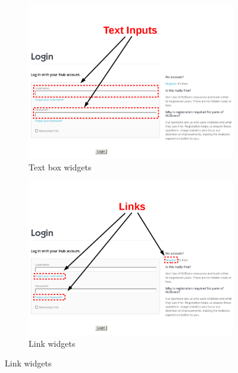 \begin{figure}
        \centering
        \begin{subfigure}[b]{0.5\textwidth}
                \centering
                \includegraphics[width=\textwidth]{../../images/annotated/hubzero_login_page_textbox.png}
                \caption{Text box widgets}
                \label{fig:login_page_text_boxes}
        \end{subfigure}
        \begin{subfigure}[b]{0.5\textwidth}
                \centering
                \includegraphics[width=\textwidth]{../../images/annotated/hubzero_login_page_links.png}
                \caption{Link widgets}
                \label{fig:login_page_links}

\end{subfigure}
\end{figure}
